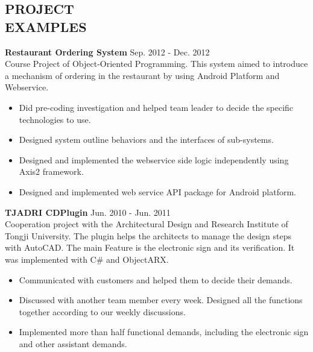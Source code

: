\documentclass[margin]{res}
\begin{document}
\begin{resume}
\section{PROJECT \\ EXAMPLES}
{\bf Restaurant Ordering System} \hfill Sep. 2012 - Dec. 2012 \\
Course Project of Object-Oriented Programming. This system aimed to introduce a mechanism of ordering in the restaurant by using Android Platform and Webservice.
\begin{itemize}
\item Did pre-coding investigation and helped team leader to decide the specific technologies to use.
\item Designed system outline behaviors and the interfaces of sub-systems.
\item Designed and implemented the webservice side logic independently using Axis2 framework.
\item Designed and implemented web service API package for Android platform.
\end{itemize}
{\bf TJADRI CDPlugin} \hfill Jun. 2010 - Jun. 2011 \\
Cooperation project with the Architectural Design and Research Institute of Tongji University. The plugin helps the architects to manage the design steps with AutoCAD. The main Feature is the electronic sign and its verification. It was implemented with C\# and ObjectARX.
\begin{itemize}
\item Communicated with customers and helped them to decide their demands.
\item Discussed with another team member every week. Designed all the functions together according to our weekly discussions.
\item Implemented more than half functional demands, including the electronic sign and other assistant demands.
\end{itemize}


\end{resume}
\end{document}
